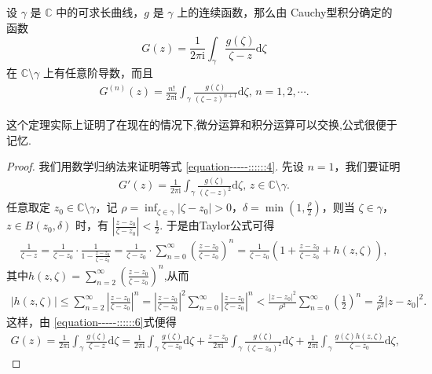 \documentclass[../../main.tex]{subfiles}
\begin{document}
\begin{theorem}\label{theorem:定理3.4.2}
设 \( \gamma \) 是 \( \mathbb{C} \) 中的可求长曲线，\( g \) 是 \( \gamma \) 上的连续函数，那么由 Cauchy型积分确定的函数
\[
G(z) = \frac{1}{2\pi \mathrm{i}} \int_{\gamma} \frac{g(\zeta)}{\zeta - z} \mathrm{d}\zeta
\]
在 \( \mathbb{C} \setminus \gamma \) 上有任意阶导数，而且
\begin{align}
G^{(n)}(z) = \frac{n!}{2\pi \mathrm{i}} \int_{\gamma} \frac{g(\zeta)}{(\zeta - z)^{n + 1}} \mathrm{d}\zeta, \, n = 1, 2, \cdots. \label{equation-----::::::4}
\end{align}
\end{theorem}
\begin{note}
这个定理实际上证明了在现在的情况下,微分运算和积分运算可以交换,公式很便于记忆.
\end{note}
\begin{proof}
我们用数学归纳法来证明等式 \eqref{equation-----::::::4}. 先设 \( n = 1 \)，我们要证明
\begin{align}\label{equation-----::::::5}
G'(z) = \frac{1}{2\pi \mathrm{i}} \int_{\gamma} \frac{g(\zeta)}{(\zeta - z)^2} \mathrm{d}\zeta, \, z \in \mathbb{C} \setminus \gamma. 
\end{align}
任意取定 \( z_0 \in \mathbb{C} \setminus \gamma \)，记 \( \rho = \inf_{\zeta \in \gamma} |\zeta - z_0| > 0 \)，\( \delta = \min\left(1, \frac{\rho}{2}\right) \)，则当 \( \zeta \in \gamma \)，\( z \in B(z_0, \delta) \) 时，有 \( \left| \frac{z - z_0}{\zeta - z_0} \right| < \frac{1}{2} \). 于是由Taylor公式可得
\begin{align}\label{equation-----::::::6}
\frac{1}{\zeta -z}=\frac{1}{\zeta -z_0}\cdot \frac{1}{1-\frac{z-z_0}{\zeta -z_0}}=\frac{1}{\zeta -z_0}\cdot \sum_{n=0}^{\infty}{\left( \frac{z-z_0}{\zeta -z_0} \right) ^n}=\frac{1}{\zeta -z_0}\left( 1+\frac{z-z_0}{\zeta -z_0}+h(z,\zeta ) \right) ,
\end{align}
其中$h(z,\zeta)=\sum_{n=2}^{\infty}{\left( \frac{z-z_0}{\zeta -z_0} \right)^n}$,从而
\begin{align}\label{equation-----::::::7}
|h(z,\zeta )|\leqslant \sum_{n=2}^{\infty}{\left| \frac{z-z_0}{\zeta -z_0} \right|^n}=\left| \frac{z-z_0}{\zeta -z_0} \right|^2\sum_{n=0}^{\infty}{\left| \frac{z-z_0}{\zeta -z_0} \right|^n}<\frac{|z-z_0|^2}{\rho ^2}\sum_{n=0}^{\infty}{\left( \frac{1}{2} \right) ^n}=\frac{2}{\rho ^2}|z-z_0|^2.
\end{align}
这样，由 \eqref{equation-----::::::6}式便得
\begin{align*}
G(z) = \frac{1}{2\pi \mathrm{i}} \int_{\gamma} \frac{g(\zeta)}{\zeta - z} \mathrm{d}\zeta = \frac{1}{2\pi \mathrm{i}} \int_{\gamma} \frac{g(\zeta)}{\zeta - z_0} \mathrm{d}\zeta + \frac{z - z_0}{2\pi \mathrm{i}} \int_{\gamma} \frac{g(\zeta)}{(\zeta - z_0)^2} \mathrm{d}\zeta   + \frac{1}{2\pi \mathrm{i}} \int_{\gamma} \frac{g(\zeta)h(z, \zeta)}{\zeta - z_0} \mathrm{d}\zeta,

\end{align*}
\end{proof}
\end{document}
